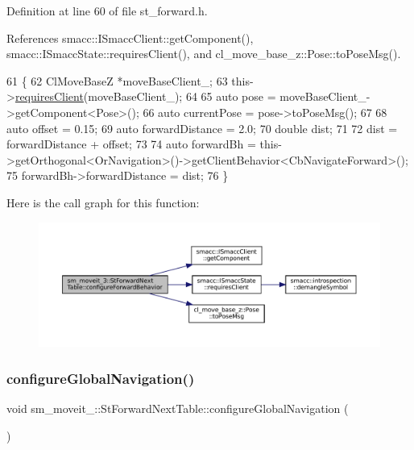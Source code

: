 Definition at line 60 of file st\+\_\+forward.\+h.



References smacc\+::\+I\+Smacc\+Client\+::get\+Component(), smacc\+::\+I\+Smacc\+State\+::requires\+Client(), and cl\+\_\+move\+\_\+base\+\_\+z\+::\+Pose\+::to\+Pose\+Msg().


\begin{DoxyCode}
61   \{
62     ClMoveBaseZ *moveBaseClient\_;
63     this->\hyperlink{classsmacc_1_1ISmaccState_a7f95c9f0a6ea2d6f18d1aec0519de4ac}{requiresClient}(moveBaseClient\_);
64 
65     \textcolor{keyword}{auto} pose = moveBaseClient\_->getComponent<Pose>();
66     \textcolor{keyword}{auto} currentPose = pose->toPoseMsg();
67 
68     \textcolor{keyword}{auto} offset = 0.15;
69     \textcolor{keyword}{auto} forwardDistance = 2.0;
70     \textcolor{keywordtype}{double} dist;
71     
72     dist = forwardDistance + offset;
73 
74     \textcolor{keyword}{auto} forwardBh = this->getOrthogonal<OrNavigation>()->getClientBehavior<CbNavigateForward>();
75     forwardBh->forwardDistance = dist;
76   \}
\end{DoxyCode}
Here is the call graph for this function\+:
\nopagebreak
\begin{figure}[H]
\begin{center}
\leavevmode
\includegraphics[width=350pt]{structsm__moveit__3_1_1StForwardNextTable_a5d08dd18998f902fa82b2264dae80c71_cgraph}
\end{center}
\end{figure}
\mbox{\label{structsm__moveit__3_1_1StForwardNextTable_a0027b604f471fad11d66c027a3ef662a}} 
\subsubsection{\texorpdfstring{configure\+Global\+Navigation()}{configureGlobalNavigation()}}
{\footnotesize\ttfamily void sm\+\_\+moveit\+\_\+::\+St\+Forward\+Next\+Table\+::configure\+Global\+Navigation (\begin{DoxyParamCaption}{ }\end{DoxyParamCaption})\hspace{0.3cm}{\ttfamily [inline]}}



